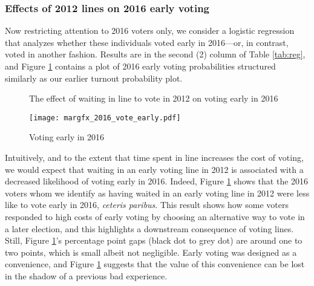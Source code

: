 \documentclass[12pt,titlepage]{article}
\begin{document}



\subsubsection*{Effects of 2012 lines on 2016 early voting}

Now restricting attention to 2016 voters only, we consider a logistic
regression that analyzes whether these individuals voted early in
2016---or, in contrast, voted in another fashion.  \mbox{Results} are
in the second (2) column of Table \ref{tab:reg}, and Figure
\ref{fig:atevotingearly2016} contains a plot of 2016 early voting
probabilities structured similarly as our earlier turnout probability
plot.

\begin{figure}[!ht]
  \caption{The effect of waiting in line to vote in 2012 on voting early in 2016}
  \centering\texttt{[image: margfx\_2016\_vote\_early.pdf]}
  \caption{Voting early in 2016}
  \label{fig:atevotingearly2016}
\end{figure}

Intuitively, and to the extent that time spent in line increases the
cost of voting, we would expect that waiting in an early voting line
in 2012 is associated with a decreased likelihood of voting early in
2016.  Indeed, Figure \ref{fig:atevotingearly2016} shows that the 2016
voters whom we identify as having waited in an early voting line in
2012 were less like to vote early in 2016, \emph{ceteris paribus}.
This result shows how some voters responded to high costs of early
voting by choosing an alternative way to vote in a later election, and
this highlights a downstream consequence of voting lines.  Still,
Figure \ref{fig:atevotingearly2016}'s percentage point gaps (black dot
to grey dot) are around one to two points, which is small albeit not
negligible.  Early voting was designed as a convenience, and Figure
\ref{fig:atevotingearly2016} suggests that the value of this
convenience can be lost in the shadow of a previous bad experience.
\end{document}
